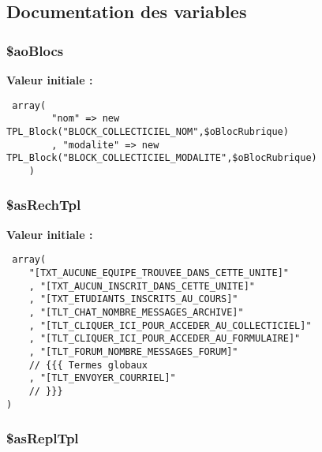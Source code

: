 \subsection{Documentation des variables}
\subsubsection{\setlength{\rightskip}{0pt plus 5cm}\$aoBlocs}\label{tableau__bord_8php_ed9ce5a81158e9ca9f751483dc1354aa}


\textbf{Valeur initiale :}

\begin{Code}\begin{verbatim} array(
        "nom" => new TPL_Block("BLOCK_COLLECTICIEL_NOM",$oBlocRubrique)
        , "modalite" => new TPL_Block("BLOCK_COLLECTICIEL_MODALITE",$oBlocRubrique)
    )
\end{verbatim}
\end{Code}
\subsubsection{\setlength{\rightskip}{0pt plus 5cm}\$asRechTpl}\label{tableau__bord_8php_bd07968245fb1e375199f35ae8ed642b}


\textbf{Valeur initiale :}

\begin{Code}\begin{verbatim} array(
    "[TXT_AUCUNE_EQUIPE_TROUVEE_DANS_CETTE_UNITE]"
    , "[TXT_AUCUN_INSCRIT_DANS_CETTE_UNITE]"
    , "[TXT_ETUDIANTS_INSCRITS_AU_COURS]"
    , "[TLT_CHAT_NOMBRE_MESSAGES_ARCHIVE]"
    , "[TLT_CLIQUER_ICI_POUR_ACCEDER_AU_COLLECTICIEL]"
    , "[TLT_CLIQUER_ICI_POUR_ACCEDER_AU_FORMULAIRE]"
    , "[TLT_FORUM_NOMBRE_MESSAGES_FORUM]"
    // {{{ Termes globaux
    , "[TLT_ENVOYER_COURRIEL]"
    // }}}
)
\end{verbatim}
\end{Code}
\subsubsection{\setlength{\rightskip}{0pt plus 5cm}\$asReplTpl}\label{tableau__bord_8php_64ffb4601c629c09cca5f34df46ac39d}


